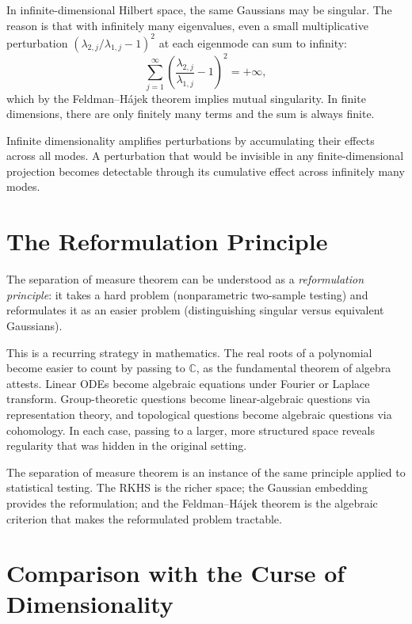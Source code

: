 \documentclass[12pt, oneside]{book}
\theoremstyle{plain}
\theoremstyle{definition}
\begin{document}
In infinite-dimensional Hilbert space, the same Gaussians may be singular. The reason is that with infinitely many eigenvalues, even a small multiplicative perturbation $(\lambda_{2,j}/\lambda_{1,j} - 1)^2$ at each eigenmode can sum to infinity:
\begin{equation}
\sum_{j=1}^{\infty} \left(\frac{\lambda_{2,j}}{\lambda_{1,j}} - 1\right)^2 = +\infty,
\end{equation}
which by the Feldman--H\'ajek theorem implies mutual singularity. In finite dimensions, there are only finitely many terms and the sum is always finite.

Infinite dimensionality amplifies perturbations by accumulating their effects across all modes. A perturbation that would be invisible in any finite-dimensional projection becomes detectable through its cumulative effect across infinitely many modes.

\section{The Reformulation Principle}

The separation of measure theorem can be understood as a \emph{reformulation principle}: it takes a hard problem (nonparametric two-sample testing) and reformulates it as an easier problem (distinguishing singular versus equivalent Gaussians).

This is a recurring strategy in mathematics. The real roots of a polynomial become easier to count by passing to $\mathbb{C}$, as the fundamental theorem of algebra attests. Linear ODEs become algebraic equations under Fourier or Laplace transform. Group-theoretic questions become linear-algebraic questions via representation theory, and topological questions become algebraic questions via cohomology. In each case, passing to a larger, more structured space reveals regularity that was hidden in the original setting.

The separation of measure theorem is an instance of the same principle applied to statistical testing. The RKHS is the richer space; the Gaussian embedding provides the reformulation; and the Feldman--H\'ajek theorem is the algebraic criterion that makes the reformulated problem tractable.

\section{Comparison with the Curse of Dimensionality}
\end{document}
